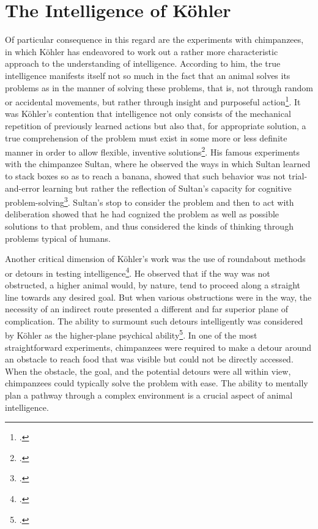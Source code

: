 \documentclass[12pt]{article}
\begin{document}
\section{The Intelligence of Köhler}

Of particular consequence in this regard are the experiments with chimpanzees, in which Köhler has endeavored to work out a rather more characteristic approach to the understanding of intelligence. According to him, the true intelligence manifests itself not so much in the fact that an animal solves its problems as in the manner of solving these problems, that is, not through random or accidental movements, but rather through insight and purposeful action\footcite{koehler1921mentality}. It was Köhler's contention that intelligence not only consists of the mechanical repetition of previously learned actions but also that, for appropriate solution, a true comprehension of the problem must exist in some more or less definite manner in order to allow flexible, inventive solutions\footcite{koehler1921mentality}. His famous experiments with the chimpanzee Sultan, where he observed the ways in which Sultan learned to stack boxes so as to reach a banana, showed that such behavior was not trial-and-error learning but rather the reflection of Sultan's capacity for cognitive problem-solving\footcite{koehler1921mentality}. Sultan's stop to consider the problem and then to act with deliberation showed that he had cognized the problem as well as possible solutions to that problem, and thus considered the kinds of thinking through problems typical of humans.

Another critical dimension of Köhler's work was the use of roundabout methods or detours in testing intelligence\footcite{koehler1927detours}. He observed that if the way was not obstructed, a higher animal would, by nature, tend to proceed along a straight line towards any desired goal. But when various obstructions were in the way, the necessity of an indirect route presented a different and far superior plane of complication. The ability to surmount such detours intelligently was considered by Köhler as the higher-plane psychical ability\footcite{thorndike1898animal}. In one of the most straightforward experiments, chimpanzees were required to make a detour around an obstacle to reach food that was visible but could not be directly accessed. When the obstacle, the goal, and the potential detours were all within view, chimpanzees could typically solve the problem with ease. The ability to mentally plan a pathway through a complex environment is a crucial aspect of animal intelligence.
\end{document}
